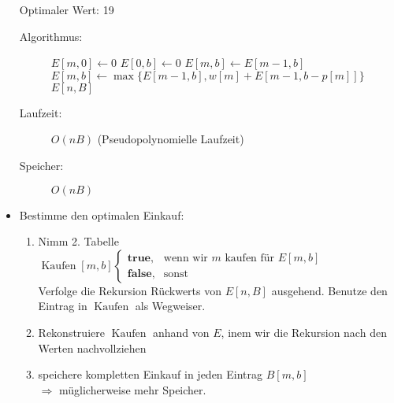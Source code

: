 \begin{itemize}
     Optimaler Wert: 19
     \begin{description}
      \item[Algorithmus:]
       \begin{center}
        \begin{algorithmic}
                \STATE $E[m,0] \gets 0$
            \ENDFOR
                \STATE $E[0,b] \gets 0$
            \ENDFOR
                        \STATE $E[m,b] \gets E[m-1,b]$
                    \ELSE
                        \STATE $E[m,b] \gets \max\{E[m-1,b], w[m] + E[m-1,b-p[m]]\}$
                    \ENDIF
                \ENDFOR
            \ENDFOR
            \RETURN $E[n, B]$
        \end{algorithmic}
       \end{center}
      \item[Laufzeit:] $O(nB)$ (Pseudopolynomielle Laufzeit)
      \item[Speicher:] $O(nB)$
     \end{description}
\item Bestimme den optimalen Einkauf:
    \renewcommand{\labelenumi}{(\theenumi)}
    \renewcommand{\theenumi}{\alph{enumi}}
    \begin{enumerate}
     \item Nimm 2. Tabelle $\operatorname{Kaufen}[m, b] \begin{cases}
                                                         \textbf{true}, & \text{wenn wir $m$ kaufen für $E[m,b]$} \\
                                                         \textbf{false}, & \text{sonst}
                                                        \end{cases}$\\
        Verfolge die Rekursion Rückwerts von $E[n,B]$ ausgehend. Benutze den Eintrag in $\operatorname{Kaufen}$ als Wegweiser.
     \item Rekonstruiere $\operatorname{Kaufen}$ anhand von $E$, inem wir die Rekursion nach den Werten nachvollziehen
     \item speichere kompletten Einkauf in jeden Eintrag $B[m,b]$\\
             $\Rightarrow$ müglicherweise mehr Speicher.
    \end{enumerate}
\end{itemize}
